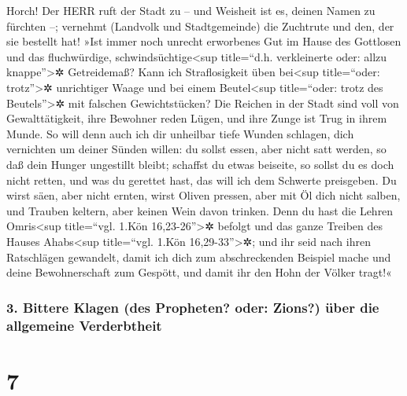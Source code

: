 Horch! Der HERR ruft der Stadt zu -- und Weisheit ist es,
deinen Namen zu fürchten --; vernehmt (Landvolk und Stadtgemeinde) die
Zuchtrute und den, der sie bestellt hat! »Ist immer noch
unrecht erworbenes Gut im Hause des Gottlosen und das fluchwürdige,
schwindsüchtige\textless sup title=``d.h. verkleinerte oder: allzu
knappe''\textgreater✲ Getreidemaß? Kann ich
Straflosigkeit üben bei\textless sup title=``oder: trotz''\textgreater✲
unrichtiger Waage und bei einem Beutel\textless sup title=``oder: trotz
des Beutels''\textgreater✲ mit falschen Gewichtstücken?
Die Reichen in der Stadt sind voll von Gewalttätigkeit,
ihre Bewohner reden Lügen, und ihre Zunge ist Trug in ihrem Munde.
So will denn auch ich dir unheilbar tiefe Wunden
schlagen, dich vernichten um deiner Sünden willen: du
sollst essen, aber nicht satt werden, so daß dein Hunger ungestillt
bleibt; schaffst du etwas beiseite, so sollst du es doch nicht retten,
und was du gerettet hast, das will ich dem Schwerte preisgeben.
Du wirst säen, aber nicht ernten, wirst Oliven pressen,
aber mit Öl dich nicht salben, und Trauben keltern, aber keinen Wein
davon trinken. Denn du hast die Lehren Omris\textless sup
title=``vgl. 1.Kön 16,23-26''\textgreater✲ befolgt und das ganze Treiben
des Hauses Ahabs\textless sup title=``vgl. 1.Kön
16,29-33''\textgreater✲; und ihr seid nach ihren Ratschlägen gewandelt,
damit ich dich zum abschreckenden Beispiel mache und deine
Bewohnerschaft zum Gespött, und damit ihr den Hohn der Völker tragt!«

\hypertarget{bittere-klagen-des-propheten-oder-zions-uxfcber-die-allgemeine-verderbtheit}{%
\subsubsection{3. Bittere Klagen (des Propheten? oder: Zions?) über die
allgemeine
Verderbtheit}\label{bittere-klagen-des-propheten-oder-zions-uxfcber-die-allgemeine-verderbtheit}}

\hypertarget{section-6}{%
\section{7}\label{section-6}}


